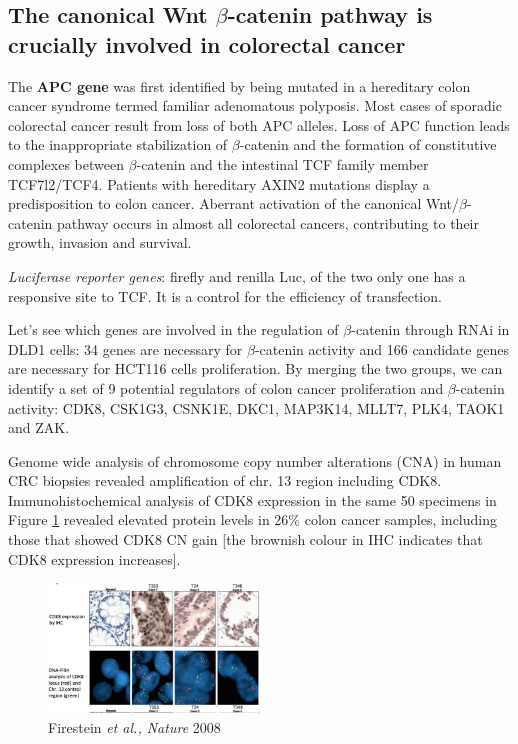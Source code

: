 \hypertarget{the-canonical-wntux3b2-catenin-pathway-is-crucially-involved-in-colorectal-cancer}{%
\subsection{The canonical Wnt $\beta$-catenin pathway is crucially involved in colorectal cancer}\label{the-canonical-wntux3b2-catenin-pathway-is-crucially-involved-in-colorectal-cancer}}

The \textbf{APC gene} was first identified by being mutated in a hereditary colon cancer syndrome termed familiar adenomatous polyposis. Most cases of sporadic colorectal cancer result from loss of both APC alleles. Loss of APC function leads to the inappropriate stabilization of $\beta$-catenin and the formation of constitutive complexes between $\beta$-catenin and the intestinal TCF family member TCF7l2/TCF4. Patients with hereditary AXIN2 mutations display a predisposition to colon cancer. Aberrant activation of the canonical Wnt/$\beta$-catenin pathway occurs in almost all colorectal cancers, contributing to their growth, invasion and survival.

\emph{Luciferase reporter genes}: firefly and renilla Luc, of the two only one has a responsive site to TCF. It is a control for the efficiency of transfection.

Let's see which genes are involved in the regulation of $\beta$-catenin through RNAi in DLD1 cells: 34 genes are necessary for $\beta$-catenin activity and 166 candidate genes are necessary for HCT116 cells proliferation. By merging the two groups, we can identify a set of 9 potential regulators of colon cancer proliferation and $\beta$-catenin activity: CDK8, CSK1G3, CSNK1E, DKC1, MAP3K14, MLLT7, PLK4, TAOK1 and ZAK.

Genome wide analysis of chromosome copy number alterations (CNA) in human CRC biopsies revealed amplification of chr. 13 region including CDK8. Immunohistochemical analysis of CDK8 expression in the same 50 specimens in Figure \ref{fig:histo} revealed elevated protein levels in 26\% colon cancer samples, including those that showed CDK8 CN gain {[}the brownish colour in IHC indicates that CDK8 expression increases{]}.

\begin{figure}
\centering
\includegraphics[width=0.5\textwidth]{../_resources/Screenshot_2022-10-10_at_12-23-14.png}
\caption{Firestein \emph{et al., Nature} 2008}
\label{fig:histo}
\end{figure}

